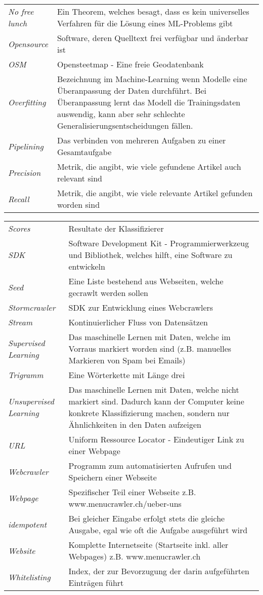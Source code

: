 \begin{table}[H]
\begin{tabular}{>{\em}p{4cm}p{12cm}}
		No free lunch & Ein Theorem, welches besagt, dass es kein universelles Verfahren für die Lösung eines ML-Problems gibt\\
		Opensource & Software, deren Quelltext frei verfügbar und änderbar ist\\
		OSM & Opensteetmap - Eine freie Geodatenbank\\
		Overfitting & Bezeichnung im Machine-Learning wenn Modelle eine Überanpassung der Daten durchführt. Bei Überanpassung lernt das Modell die Trainingsdaten auswendig, kann aber sehr schlechte Generalisierungsentscheidungen fällen.\\
		Pipelining & Das verbinden von mehreren Aufgaben zu einer Gesamtaufgabe\\
		Precision & Metrik, die angibt, wie viele gefundene Artikel auch relevant sind\\
		Recall & Metrik, die angibt, wie viele relevante Artikel gefunden worden sind\\
	\end{tabular}
\end{table}
\begin{table}[H]
	\begin{tabular}{>{\em}p{4cm}p{12cm}}
		Scores & Resultate der Klassifizierer\\
		SDK & Software Development Kit - Programmierwerkzeug und Bibliothek, welches hilft, eine Software zu entwickeln\\
		Seed & Eine Liste bestehend aus Webseiten, welche gecrawlt werden sollen\\
		Stormcrawler & SDK zur Entwicklung eines Webcrawlers\\
		Stream & Kontinuierlicher Fluss von Datensätzen\\
		Supervised Learning & Das maschinelle Lernen mit Daten, welche im Vorraus markiert worden sind (z.B. manuelles Markieren von Spam bei Emails)\\
		Trigramm & Eine Wörterkette mit Länge drei\\
		Unsupervised Learning & Das maschinelle Lernen mit Daten, welche nicht markiert sind. Dadurch kann der Computer keine konkrete Klassifizierung machen, sondern nur Ähnlichkeiten in den Daten aufzeigen\\
		URL & Uniform Ressource Locator - Eindeutiger Link zu einer Webpage\\
		Webcrawler & Programm zum automatisierten Aufrufen und Speichern einer Webseite\\
		Webpage & Spezifischer Teil einer Webseite z.B. www.menucrawler.ch/ueber-uns\\
		idempotent & Bei gleicher Eingabe erfolgt stets die gleiche Ausgabe, egal wie oft die Aufgabe ausgeführt wird\\
		Website & Komplette Internetseite (Startseite inkl. aller Webpages) z.B. www.menucrawler.ch\\
		Whitelisting & Index, der zur Bevorzugung der darin aufgeführten Einträgen führt\\	
	\end{tabular}
\end{table}
